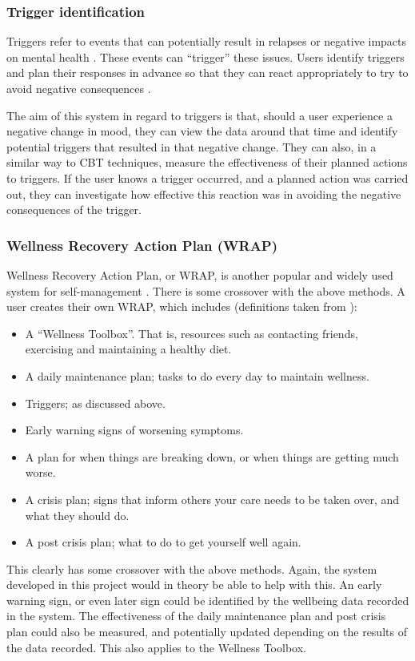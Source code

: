 \documentclass[11pt,openright,a4paper]{report}
\begin{document}
\subsubsection{Trigger identification}
Triggers refer to events that can potentially result in relapses or negative impacts on mental health \parencite{samhsatriggers}. These events can \enquote{trigger} these issues. Users identify triggers and plan their responses in advance so that they can react appropriately to try to avoid negative consequences \parencite{samhsatriggers}.

The aim of this system in regard to triggers is that, should a user experience a negative change in mood, they can view the data around that time and identify potential triggers that resulted in that negative change. They can also, in a similar way to CBT techniques, measure the effectiveness of their planned actions to triggers. If the user knows a trigger occurred, and a planned action was carried out, they can investigate how effective this reaction was in avoiding the negative consequences of the trigger.

\subsubsection{Wellness Recovery Action Plan (WRAP)}
Wellness Recovery Action Plan, or WRAP, is another popular and widely used system for self-management \parencite{mhrwrap}. There is some crossover with the above methods. A user creates their own WRAP, which includes (definitions taken from \parencite{mhrwrap}):
\begin{itemize}
\item A \enquote{Wellness Toolbox}. That is, resources such as contacting friends, exercising and maintaining a healthy diet.
\item A daily maintenance plan; tasks to do every day to maintain wellness.
\item Triggers; as discussed above.
\item Early warning signs of worsening symptoms.
\item A plan for when things are breaking down, or when things are getting much worse.
\item A crisis plan; signs that inform others your care needs to be taken over, and what they should do.
\item A post crisis plan; what to do to get yourself well again.
\end{itemize}

This clearly has some crossover with the above methods. Again, the system developed in this project would in theory be able to help with this. An early warning sign, or even later sign could be identified by the wellbeing data recorded in the system. The effectiveness of the daily maintenance plan and post crisis plan could also be measured, and potentially updated depending on the results of the data recorded. This also applies to the Wellness Toolbox.
\end{document}
